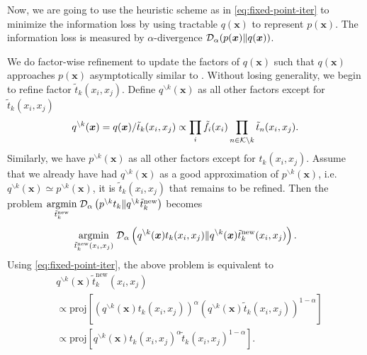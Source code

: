 \documentclass[conference]{IEEEtran}
\begin{document}
Now, we are going to use the heuristic scheme as in \autoref{eq:fixed-point-iter} to minimize the information loss by using tractable $q(\bm{x})$ to represent $p(\bm{x})$. The information loss is measured by $\alpha$-divergence $\mathcal{D}_{\alpha}(p(\bm{x}) \| q(\bm{x}))$.

We do factor-wise refinement to update the factors of $q(\bm{x})$ such that $q(\bm{x})$ approaches $p(\bm{x})$ asymptotically similar to \cite{divergence-measures-and-message-passing,Minka:2001:EPA:647235.720257}. Without losing generality, we begin to refine factor $\tilde{t}_k(x_i, x_j)$. Define $q^{\backslash k}(\bm{x})$ as all other factors except for $\tilde{t}_k(x_i, x_j)$
\begin{equation}
  q^{\backslash k}(\bm{x}) = q(\bm{x})/\tilde{t}_k(x_i, x_j) \propto \prod_{{i}} \tilde{f}_i(x_i) \prod_{n\in \mathcal{K} \backslash k} \tilde{t}_n(x_i, x_j).
\end{equation}
Similarly, we have $p^{\backslash k}(\bm{x})$ as all other factors except for $t_k(x_i, x_j)$. Assume that we already have had $q^{\backslash k}(\bm{x})$ as a good approximation of $p^{\backslash k}(\bm{x})$, i.e. $q^{\backslash k}(\bm{x}) \simeq p^{\backslash k}(\bm{x})$, it is $\tilde{t}_k(x_i, x_j)$ that remains to be refined. 
Then the problem $\underset{\tilde{t}_k^{\text{new}}}{\operatorname{argmin}}\; \mathcal{D}_{\alpha}\left(  p^{\backslash k}t_k\|q^{\backslash k}\tilde{t}_k^{\text{new}}\right)$ becomes \vspace{-0.3cm}
\begin{equation}
  \underset{\tilde{t}_k^{\text{new}}(x_i, x_j)}{\operatorname{argmin}}\; \mathcal{D}_{\alpha}\left(  q^{\backslash k}(\bm{x}) t_k(x_i, x_j)\|q^{\backslash k}(\bm{x}) \tilde{t}_k^{\text{new}}(x_i, x_j) \right).
\end{equation}
Using \autoref{eq:fixed-point-iter}, the above problem is equivalent to
\begin{align}\label{eq:update-rule}
  &q^{\backslash k}(\bm{x}) \tilde{t}_k^{\text{new}}(x_i, x_j) \nonumber\\
  &\propto \text{proj}\left[ \left(q^{\backslash k}(\bm{x}) t_k(x_i, x_j)  \right)^{\alpha} \left(q^{\backslash k}(\bm{x}) \tilde{t}_k(x_i, x_j)  \right)^{1-\alpha} \right] \nonumber \\
  & \propto \text{proj}\left[ q^{\backslash k}(\bm{x}) t_k(x_i, x_j)^{\alpha} \tilde{t}_k(x_i, x_j)^{1-\alpha} \right].
\end{align}
\end{document}
